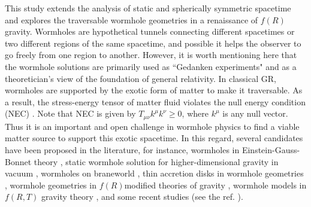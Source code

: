 This study extends the analysis of static and spherically symmetric spacetime and explores the traversable wormhole geometries in a renaissance of $f(R)$ gravity. Wormholes are hypothetical tunnels connecting different spacetimes or two different regions of the same spacetime, and possible it helps the observer to go freely from one region to another. However, it is worth mentioning here that the wormhole solutions are primarily used as ``Gedanken experiments" and as a theoretician's view of the foundation of general relativity. In classical GR, wormholes are supported by the exotic form of matter to make it traversable. As a result, the stress-energy tensor of matter fluid violates the null energy condition (NEC) \cite{ref40}. Note that NEC is given by $T_{\mu\nu}k^{\mu}k^{\nu}\geq 0$, where $k^{\mu}$ is any null vector. Thus it is an important and open challenge in wormhole physics to find a viable matter source to support this exotic spacetime. In this regard, several candidates have been proposed in the literature, for instance, wormholes in Einstein-Gauss-Bonnet theory \cite{ref41}, static wormhole solution for higher-dimensional gravity in vacuum \cite{ref42}, wormholes on braneworld \cite{ref43,ref44,ref45,ref46}, thin accretion disks in wormhole geometries \cite{ref47}, wormhole geometries in $f(R) $modified theories of gravity \cite{ref48,ref49,ref50,ref52,ref52,ref53}, wormhole models in $f(R,T)$ gravity theory \cite{ref54,ref55}, and some recent studies (see the ref. \cite{ref56,ref57,ref58,ref59,ref60,ref61}).

